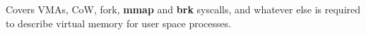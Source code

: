 Covers VMAs, CoW, fork, \textbf{mmap} and \textbf{brk} syscalls, and whatever
else is required to describe virtual memory for user space processes.\\
